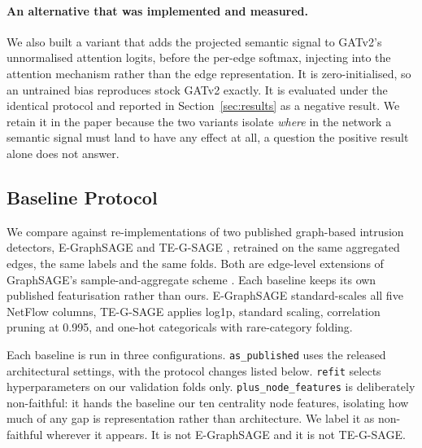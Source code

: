 \paragraph{An alternative that was implemented and measured.} We also built a variant that adds
the projected semantic signal to GATv2's unnormalised attention logits, before the per-edge
softmax, injecting into the attention mechanism rather than the edge representation. It is
zero-initialised, so an untrained bias reproduces stock GATv2 exactly. It is evaluated under
the identical protocol and reported in Section~\ref{sec:results} as a negative result. We
retain it in the paper because the two variants isolate \emph{where} in the network a semantic
signal must land to have any effect at all, a question the positive result
alone does not answer.

\subsection{Baseline Protocol}

We compare against re-implementations of two published graph-based intrusion detectors,
E-GraphSAGE \citep{lo2022egraphsage} and TE-G-SAGE \citep{tegsage2025}, retrained on the same
aggregated edges, the same labels and the same folds. Both are edge-level extensions of
GraphSAGE's sample-and-aggregate scheme \citep{hamilton2017graphsage}. Each baseline keeps
its own published featurisation rather than ours. E-GraphSAGE standard-scales all five NetFlow columns,
TE-G-SAGE applies log1p, standard scaling, correlation pruning at 0.995, and one-hot
categoricals with rare-category folding.

Each baseline is run in three configurations. \texttt{as\_published} uses the released architectural settings, with the protocol changes listed below. \texttt{refit} selects hyperparameters on our validation folds only.
\texttt{plus\_node\_features} is deliberately non-faithful: it hands the baseline our ten
centrality node features, isolating how much of any gap is representation rather than
architecture. We label it as non-faithful wherever it appears. It is not E-GraphSAGE and it is
not TE-G-SAGE.

